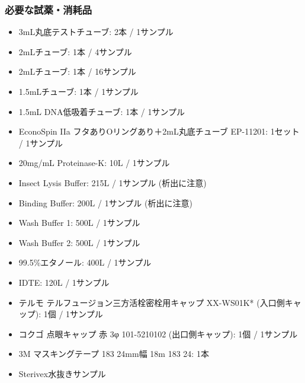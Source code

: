 \documentclass[titlepage,10pt,a4paper,uplatex]{jsbook}
\begin{document}
\subsubsection{必要な試薬・消耗品}
\begin{itemize}
\item 3mL丸底テストチューブ: 2本 / 1サンプル
\item 2mLチューブ: 1本 / 4サンプル
\item 2mLチューブ: 1本 / 16サンプル
\item 1.5mLチューブ: 1本 / 1サンプル
\item 1.5mL DNA低吸着チューブ: 1本 / 1サンプル
\item EconoSpin IIa フタありOリングあり＋2mL丸底チューブ EP-11201: 1セット / 1サンプル
\item 20mg/mL Proteinase-K: 10{\textmu}L / 1サンプル
\item Insect Lysis Buffer: 215{\textmu}L / 1サンプル (析出に注意)
\item Binding Buffer: 200{\textmu}L / 1サンプル (析出に注意)
\item Wash Buffer 1: 500{\textmu}L / 1サンプル
\item Wash Buffer 2: 500{\textmu}L / 1サンプル
\item 99.5\%エタノール: 400{\textmu}L / 1サンプル
\item IDTE: 120{\textmu}L / 1サンプル
\item テルモ テルフュージョン三方活栓密栓用キャップ XX-WS01K* (入口側キャップ): 1個 / 1サンプル
\item コクゴ 点眼キャップ 赤 3φ 101-5210102 (出口側キャップ): 1個 / 1サンプル
\item 3M マスキングテープ 183 24mm幅 18m 183 24: 1本
\item Sterivex水抜きサンプル
\end{itemize}
\end{document}
